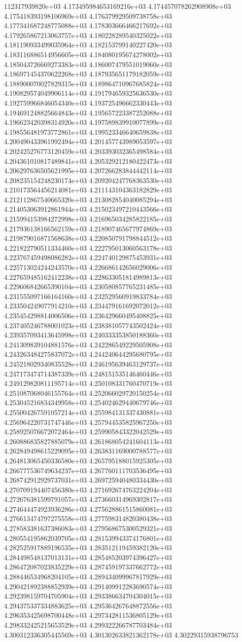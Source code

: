 112317939820e+03	4.173495984653169216e+03	4.174457078262908908e+03	4.175418393198106969e+03	4.176379929509738758e+03	4.177341687248775088e+03	4.178303666466217692e+03	4.179265867213063757e+03	4.180228289540325022e+03	4.181190933499035964e+03	4.182153799140227420e+03	4.183116886514956605e+03	4.184080195674278002e+03	4.185043726669273383e+03	4.186007479551019060e+03	4.186971454370622268e+03	4.187935651179182059e+03	4.188900070027829315e+03	4.189864710967685824e+03	4.190829574049906114e+03	4.191794659325636530e+03	4.192759966846054340e+03	4.193725496662330443e+03	4.194691248825664843e+03	4.195657223387252088e+03	4.196623420398314920e+03	4.197589839910077899e+03	4.198556481973772861e+03	4.199523346640659838e+03	4.200490433961992494e+03	4.201457743989053597e+03	4.202425276773120459e+03	4.203393032365498584e+03	4.204361010817489841e+03	4.205329212180422473e+03	4.206297636505621995e+03	4.207266283844442114e+03	4.208235154248230174e+03	4.209204247768363530e+03	4.210173564456214081e+03	4.211143104363182829e+03	4.212112867540665320e+03	4.213082854040085294e+03	4.214053063912861944e+03	4.215023497210443566e+03	4.215994153984272998e+03	4.216965034285822185e+03	4.217936138166562159e+03	4.218907465677974869e+03	4.219879016871568638e+03	4.220850791798844512e+03	4.221822790511334460e+03	4.222795013060563178e+03	4.223767459498086282e+03	4.224740129875453931e+03	4.225713024244243570e+03	4.226686142656029006e+03	4.227659485162412238e+03	4.228633051814989813e+03	4.229606842665390104e+03	4.230580857765231485e+03	4.231555097166164160e+03	4.232529560919833784e+03	4.233504249077914210e+03	4.234479161692072012e+03	4.235454298814006506e+03	4.236429660495408825e+03	4.237405246788001023e+03	4.238381057743502424e+03	4.239357093413645998e+03	4.240333353850188360e+03	4.241309839104881576e+03	4.242286549229505908e+03	4.243263484275837072e+03	4.244240644295680795e+03	4.245218029340835528e+03	4.246195639463129737e+03	4.247173474714387339e+03	4.248151535146460446e+03	4.249129820811195714e+03	4.250108331760470719e+03	4.251087068046155764e+03	4.252066029720150254e+03	4.253045216834349958e+03	4.254024629440679746e+03	4.255004267591057214e+03	4.255984131337430881e+03	4.256964220731747446e+03	4.257944535825967250e+03	4.258925076672072464e+03	4.259905843322042529e+03	4.260886835827885079e+03	4.261868054241604113e+03	4.262849498615229095e+03	4.263831169000788577e+03	4.264813065450336580e+03	4.265795188015925305e+03	4.266777536749634237e+03	4.267760111703536495e+03	4.268742912929737031e+03	4.269725940480334430e+03	4.270709194407456380e+03	4.271692674763224204e+03	4.272676381599791057e+03	4.273660314969302817e+03	4.274644474923936286e+03	4.275628861515860081e+03	4.276613474797275558e+03	4.277598314820380438e+03	4.278583381637386083e+03	4.279568675300529321e+03	4.280554195862039705e+03	4.281539943374176801e+03	4.282525917889196535e+03	4.283512119459382120e+03	4.284498548137013131e+03	4.285485203974396427e+03	4.286472087023835229e+03	4.287459197337662772e+03	4.288446534968204105e+03	4.289434099967817929e+03	4.290421892388852939e+03	4.291409912283690574e+03	4.292398159704705904e+03	4.293386634704304015e+03	4.294375337334883625e+03	4.295364267648872556e+03	4.296353425698700448e+03	4.297342811536805129e+03	4.298332425215653529e+03	4.299322266787703484e+03	4.300312336305445569e+03	4.301302633821362178e+03	4.30229315938796753